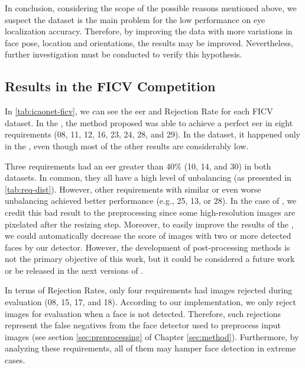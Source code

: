 In conclusion, considering the scope of the possible reasons mentioned above, we suspect the dataset is the main problem for the low performance on eye localization accuracy. Therefore, by improving the data with more variations in face pose, location and orientations, the results may be improved. Nevertheless, further investigation must be conducted to verify this hypothesis.


\subsection{Results in the FICV Competition} \label{sec:ficv_results}

In \autoref{tab:icaonet-ficv}, we can see the \acl{eer} and Rejection Rate for each FICV dataset. In the \ficvtest, the method proposed was able to achieve a perfect \acs{eer} in eight requirements (08, 11, 12, 16, 23, 24, 28, and 29). In the \ficvofficial dataset, it happened only in the \veiloverface, even though most of the other results are considerably low. 



Three requirements had an \acs{eer} greater than 40\% (10, 14, and 30) in both datasets. In common, they all have a high level of unbalancing (as presented in \autoref{tab:req-dist}). However, other requirements with similar or even worse unbalancing achieved better performance (e.g., 25, 13, or 28). In the case of \pixelation, we credit this bad result to the preprocessing since some high-resolution images are pixelated after the resizing step. Moreover, to easily improve the results of the \otherfacesortoys, we could automatically decrease the score of images with two or more detected faces by our detector. However, the development of post-processing methods is not the primary objective of this work, but it could be considered a future work or be released in the next versions of \methodname.

In terms of Rejection Rates, only four requirements had images rejected during evaluation (08, 15, 17, and 18). According to our implementation, we only reject images for evaluation when a face is not detected. Therefore, such rejections represent the false negatives from the face detector used to preprocess input images (see section \ref{sec:preprocessing} of Chapter \ref{sec:method}). Furthermore, by analyzing these requirements, all of them may hamper face detection in extreme cases. 

